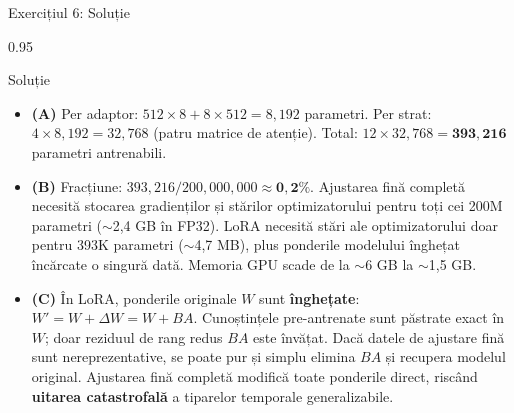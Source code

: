 \documentclass[9pt, aspectratio=169, t]{beamer}
\begin{document}
\begin{frame}{Exercițiul 6: Soluție}
    \begin{cminipage}{0.95\textwidth}
    \begin{exampleblock}{Soluție}
        {\small
        \begin{itemize}\setlength{\itemsep}{3pt}
            \item \textcolor{MainBlue}{\textbf{(A)}} Per adaptor: $512 \times 8 + 8 \times 512 = 8{,}192$ parametri. Per strat: $4 \times 8{,}192 = 32{,}768$ (patru matrice de atenție). Total: $12 \times 32{,}768 = \mathbf{393{,}216}$ parametri antrenabili.
            \item \textcolor{MainBlue}{\textbf{(B)}} Fracțiune: $393{,}216 / 200{,}000{,}000 \approx \mathbf{0{,}2\%}$. Ajustarea fină completă necesită stocarea gradienților și stărilor optimizatorului pentru toți cei 200M parametri ($\sim$2,4 GB în FP32). LoRA necesită stări ale optimizatorului doar pentru 393K parametri ($\sim$4,7 MB), plus ponderile modelului înghețat încărcate o singură dată. Memoria GPU scade de la $\sim$6 GB la $\sim$1,5 GB.
            \item \textcolor{MainBlue}{\textbf{(C)}} În LoRA, ponderile originale $W$ sunt \textbf{înghețate}: $W' = W + \Delta W = W + BA$. Cunoștințele pre-antrenate sunt păstrate exact în $W$; doar reziduul de rang redus $BA$ este învățat. Dacă datele de ajustare fină sunt nereprezentative, se poate pur și simplu elimina $BA$ și recupera modelul original. Ajustarea fină completă modifică toate ponderile direct, riscând \textbf{uitarea catastrofală} a tiparelor temporale generalizabile.
        \end{itemize}
        }
    \end{exampleblock}
    \end{cminipage}
\end{frame}
\end{document}
